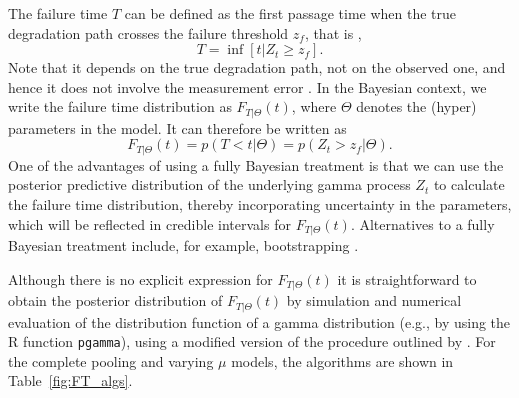 \documentclass{article}
\begin{document}
The failure time $T$ can be defined as the first passage time when the true degradation path crosses the failure threshold $z_f$, that is \citep{balakrishnan_2017},
$$
T = \inf\left[ t|Z_t \geq z_f \right].
$$
Note that it depends on the true degradation path, not on the observed one, and hence it does not involve the measurement error \citep{hamada_2008}. In the Bayesian context, we write the failure time distribution as $F_{T|\Theta}(t)$, where $\Theta$ denotes the (hyper) parameters in the model. It can therefore be written as
$$
F_{T|\Theta}(t) = p(T < t | \Theta) = p(Z_t > z_f | \Theta).
$$
One of the advantages of using a fully Bayesian treatment is that we can use the posterior predictive distribution of the underlying gamma process $Z_t$ to calculate the failure time distribution, thereby incorporating uncertainty in the parameters, which will be reflected in credible intervals for $F_{T|\Theta}(t)$. Alternatives to a fully Bayesian treatment include, for example, bootstrapping \citep{peng_2018}.

Although there is no explicit expression for $F_{T|\Theta}(t)$ it is straightforward to obtain the posterior distribution of $F_{T|\Theta}(t)$ by simulation and numerical evaluation of the distribution function of a gamma distribution (e.g., by using the R function \texttt{pgamma}), using a modified version of the procedure outlined by \citet[Sec.~8.2.1]{hamada_2008}. For the complete pooling and varying $\mu$ models, the algorithms are shown in Table~\ref{fig:FT_algs}.
\end{document}
